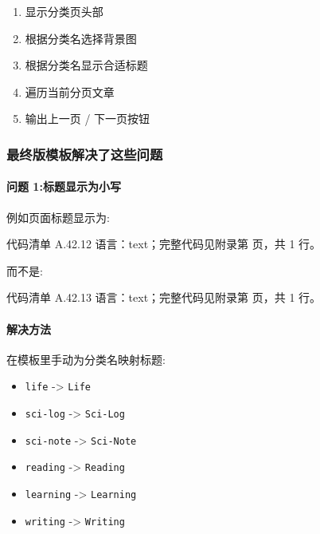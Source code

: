 \documentclass[lang=cn,scheme=chinese,color=blue,device=normal,toc=onecol,math=cm]{elegantbook}
\begin{document}
\begin{enumerate}
\item 显示分类页头部
\item 根据分类名选择背景图
\item 根据分类名显示合适标题
\item 遍历当前分页文章
\item 输出上一页 /\allowbreak{} 下一页按钮
\end{enumerate}


\subsubsection{最终版模板解决了这些问题}


\paragraph{问题 1:标题显示为小写}


例如页面标题显示为:\par


\begin{codeindexbox}{代码清单 A.42.12}
语言：text；完整代码见附录第 \pageref{code:42:12} 页，共 1 行。
\end{codeindexbox}


而不是:\par


\begin{codeindexbox}{代码清单 A.42.13}
语言：text；完整代码见附录第 \pageref{code:42:13} 页，共 1 行。
\end{codeindexbox}


\paragraph{解决方法}


在模板里手动为分类名映射标题:\par


\begin{itemize}
\item \texttt{life} -> \texttt{Life}
\item \texttt{sci-log} -> \texttt{Sci-Log}
\item \texttt{sci-note} -> \texttt{Sci-Note}
\item \texttt{reading} -> \texttt{Reading}
\item \texttt{learning} -> \texttt{Learning}
\item \texttt{writing} -> \texttt{Writing}
\end{itemize}
\end{document}
